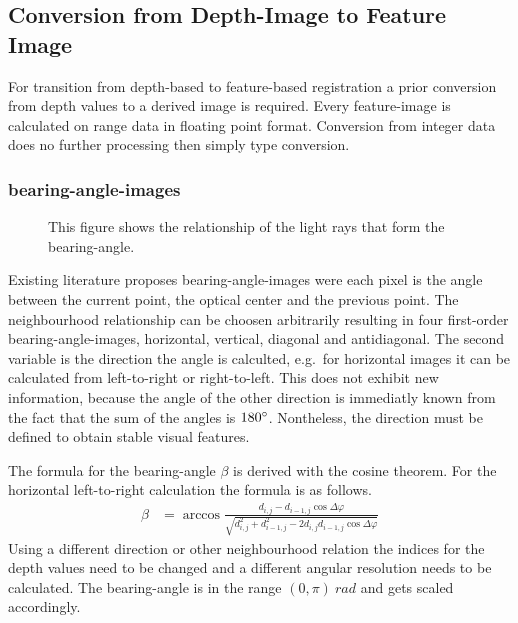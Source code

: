 \subsection{Conversion from Depth-Image to Feature Image}

For transition from depth-based to feature-based registration a prior conversion from depth values to a derived image is required.
Every feature-image is calculated on range data in floating point format.
Conversion from integer data does no further processing then simply type conversion.

\subsubsection{\Glspl{bearing-angle-image}}

\begin{figure}[H]
    \centering
    \caption[Schematic Representation of Bearing-Angles]{This figure shows the relationship of the light rays that form the \gls{bearing-angle}.}
\end{figure}

Existing literature\cite{Scaramuzza2007,Lin2017} proposes \Glspl{bearing-angle-image} were each pixel is the angle between the current point, the optical center and the previous point.
The neighbourhood relationship can be choosen arbitrarily resulting in four first-order \Glspl{bearing-angle-image}, horizontal, vertical, diagonal and antidiagonal.
The second variable is the direction the angle is calculted, e.g.~for horizontal images it can be calculated from left-to-right or right-to-left.
This does not exhibit new information, because the angle of the other direction is immediatly known from the fact that the sum of the angles is $180\degree$.
Nontheless, the direction must be defined to obtain stable visual features.

The formula for the \gls{bearing-angle} $\beta$ is derived with the cosine theorem.
For the horizontal left-to-right calculation the formula is as follows.
\begin{align}
    \beta&= \arccos%
            \frac{d_{i,j} - d_{i-1,j} \cos \Delta\varphi}%
                 {\sqrt{d_{i,j}^2 + d_{i-1,j}^2 - 2 d_{i,j} d_{i-1,j} \cos \Delta\varphi}}
\end{align}
Using a different direction or other neighbourhood relation the indices for the depth values need to be changed and a different angular resolution needs to be calculated.
The \Gls{bearing-angle} is in the range $(0, \pi)~rad$ and gets scaled accordingly.


